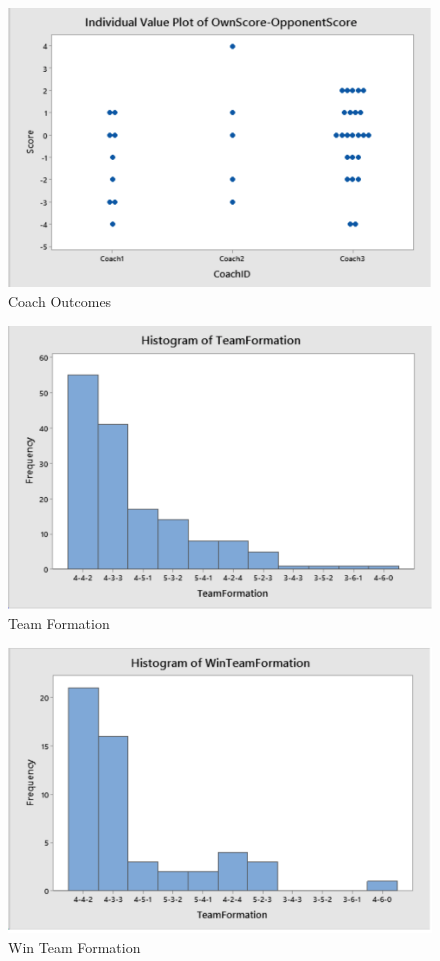 \documentclass[12pt]{article}
\begin{document}
\begin{figure}[ht]
\begin{center}
\includegraphics[scale=0.5]{images/Screen Shot 2020-02-17 at 8.29.23 PM.png}
\caption{Coach Outcomes}
\end{center}
\end{figure}
\begin{figure}[ht]
\begin{center}
\includegraphics[scale=0.5]{images/Screen Shot 2020-02-17 at 8.29.29 PM.png}
\caption{Team Formation}
\end{center}
\end{figure}
\begin{figure}[ht]
\begin{center}
\includegraphics[scale=0.5]{images/Screen Shot 2020-02-17 at 8.29.34 PM.png}
\caption{Win Team Formation}
\end{center}
\end{figure}
\end{document}

